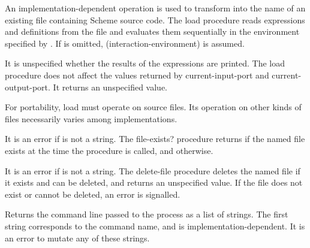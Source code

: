 \begin{entry}{%
}

An implementation-dependent operation is used to transform
 into the name of an existing file
containing Scheme source code.  The {\cf load} procedure reads
expressions and definitions from the file and evaluates them
sequentially in the environment specified by .
If  is omitted, {\cf (interaction-environment)}
is assumed.

It is unspecified whether the results of the expressions
are printed.  The {\cf load} procedure does not affect the values
returned by {\cf current-input-port} and {\cf current-output-port}.
It returns an unspecified value.


\begin{rationale}
For portability, {\cf load} must operate on source files.
Its operation on other kinds of files necessarily varies among
implementations.
\end{rationale}
\end{entry}

\begin{entry}{%
}

It is an error if  is not a string. The {\cf file-exists?} procedure returns
\schtrue{} if the named file exists at the time the procedure is called,
and \schfalse{} otherwise.

\end{entry}

\begin{entry}{%
}

It is an error if  is not a string. The {\cf delete-file} procedure deletes the
named file if it exists and can be deleted, and returns an unspecified
value.  If the file does not exist or cannot be deleted, an error
is signalled.

\end{entry}

\begin{entry}{%
}

Returns the command line passed to the process as a list of
strings.  The first string corresponds to the command name, and is
implementation-dependent.  It is an error to mutate any of these strings.
\end{entry}

